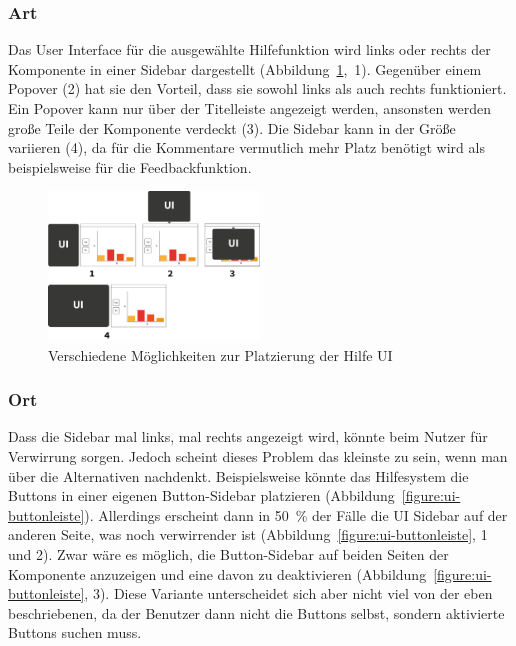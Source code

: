 \documentclass[
	headsepline,
	footsepline,
	fontsize=12pt,
	bibliography=totoc
]{scrbook}
\begin{document}
\subsubsection{Art}


Das User Interface für die ausgewählte Hilfefunktion wird links oder rechts der Komponente in einer Sidebar dargestellt (Abbildung~\ref{figure:ui-basics},~1). Gegenüber einem Popover (2) hat sie den Vorteil, dass sie sowohl links als auch rechts funktioniert. Ein Popover kann nur über der Titelleiste angezeigt werden, ansonsten werden große Teile der Komponente verdeckt (3). Die Sidebar kann in der Größe variieren (4), da für die Kommentare vermutlich mehr Platz benötigt wird als beispielsweise für die Feedbackfunktion.

\begin{figure}[htbp]
   \centering
   \includegraphics[width=0.5\textwidth]{images/konzeption-ui-basics.png}
   \caption{Verschiedene Möglichkeiten zur Platzierung der Hilfe UI}
   \label{figure:ui-basics}
\end{figure}

\subsubsection{Ort}

Dass die Sidebar mal links, mal rechts angezeigt wird, könnte beim Nutzer für Verwirrung sorgen. Jedoch scheint dieses Problem das kleinste zu sein, wenn man über die Alternativen nachdenkt.
Beispielsweise könnte das Hilfesystem die Buttons in einer eigenen Button-Sidebar platzieren (Abbildung~\ref{figure:ui-buttonleiste}). Allerdings erscheint dann in 50~\% der Fälle die UI Sidebar auf der anderen Seite, was noch verwirrender ist (Abbildung~\ref{figure:ui-buttonleiste}, 1 und 2). Zwar wäre es möglich, die Button-Sidebar auf beiden Seiten der Komponente anzuzeigen und eine davon zu deaktivieren (Abbildung~\ref{figure:ui-buttonleiste}, 3). Diese Variante unterscheidet sich aber nicht viel von der eben beschriebenen, da der Benutzer dann nicht die Buttons selbst, sondern aktivierte Buttons suchen muss.
\end{document}
